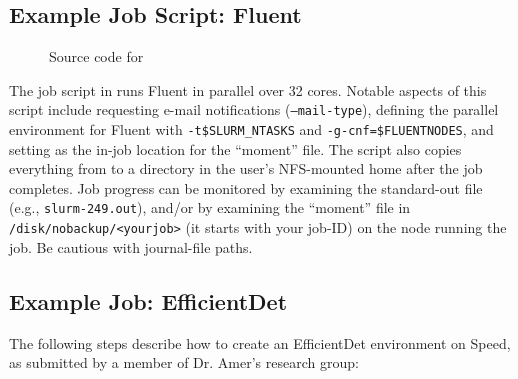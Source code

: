 \subsection{Example Job Script: Fluent}

\begin{figure}[htpb]
  
  \caption{Source code for }
  \label{fig:fluent.sh}
\end{figure}

The job script in  runs Fluent in parallel over 32 cores. 
Notable aspects of this script include requesting e-mail notifications (\texttt{--mail-type}), 
defining the parallel environment for Fluent with \texttt{-t\$SLURM\_NTASKS} and \texttt{-g-cnf=\$FLUENTNODES}, 
and setting  as the in-job location for the ``moment''  file.
The script also copies everything from  to a directory in the user's NFS-mounted home after the job completes.
Job progress can be monitored by examining the standard-out file (e.g.,
\texttt{slurm-249.out}), and/or by examining the ``moment'' file in 
\texttt{/disk/nobackup/<yourjob>} (it starts with your job-ID) on the node running
the job. Be cautious with journal-file paths.

\subsection{Example Job: EfficientDet}

The following steps describe how to create an EfficientDet environment on Speed, 
as submitted by a member of Dr. Amer’s research group:

